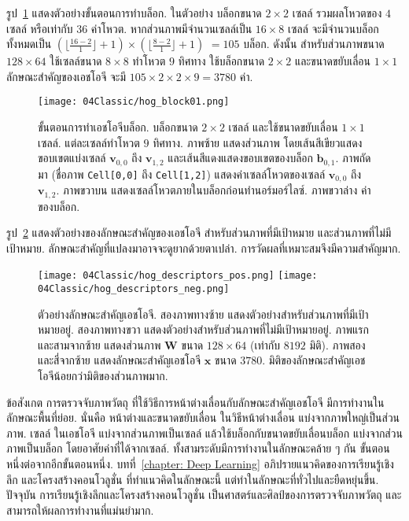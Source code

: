 รูป~\ref{fig: hog block01} 
แสดงตัวอย่างขั้นตอนการทำบล็อก.
ในตัวอย่าง บล็อกขนาด $2 \times 2$ เซลล์ รวมผลโหวตของ $4$ เซลล์ หรือเท่ากับ $36$ ค่าโหวต.
หากส่วนภาพมีจำนวนเซลล์เป็น $16 \times 8$ เซลล์
จะมีจำนวนบล็อกทั้งหมดเป็น $\left( \lfloor \frac{16 - 2}{1} \rfloor + 1 \right) \times \left( \lfloor \frac{8 - 2}{1} \rfloor + 1 \right)$ $=105$ บล็อก.
ดังนั้น สำหรับส่วนภาพขนาด $128 \times 64$ ใช้เซลล์ขนาด $8 \times 8$ ทำโหวต $9$ ทิศทาง
ใช้บล็อกขนาด $2 \times 2$ และขนาดขยับเลื่อน $1 \times 1$ 
ลักษณะสำคัญของเอชโอจี จะมี $105 \times 2 \times 2 \times 9 = 3780$ ค่า.

%
\begin{figure}
	\begin{center}
			\texttt{[image: 04Classic/hog\_block01.png]}
		\caption[ตัวอย่างการทำเอชโอจีบล็อก]{ขั้นตอนการทำเอชโอจีบล็อก.
		บล็อกขนาด $2 \times 2$ เซลล์ และใช้ขนาดขยับเลื่อน $1 \times 1$ เซลล์.
		แต่ละเซลล์ทำโหวต $9$ ทิศทาง.
		ภาพซ้าย แสดงส่วนภาพ โดยเส้นสีเขียวแสดงขอบเขตแบ่งเซลล์ $\bm{v}_{0,0}$ ถึง $\bm{v}_{1,2}$
		และเส้นสีแดงแสดงขอบเขตของบล็อก $\bm{b}_{0,1}$.	
		ภาพถัดมา (ชื่อภาพ \texttt{Cell[0,0]} ถึง \texttt{Cell[1,2]}) แสดงค่าเซลล์โหวตของเซลล์ $\bm{v}_{0,0}$ ถึง $\bm{v}_{1,2}$.
		ภาพขวาบน แสดงเซลล์โหวตภายในบล็อกก่อนทำนอร์มอร์ไลซ์.
		ภาพขวาล่าง ค่าของบล็อก.
		}
		\label{fig: hog block01}
	\end{center}
\end{figure}
%

รูป~\ref{fig: hog descriptors} แสดงตัวอย่างของลักษณะสำคัญของเอชโอจี สำหรับส่วนภาพที่มีเป้าหมาย และส่วนภาพที่ไม่มีเป้าหมาย.
ลักษณะสำคัญที่แปลงมาอาจจะดูยากด้วยตาเปล่า.
การวัดผลที่เหมาะสมจึงมีความสำคัญมาก. 

%
\begin{figure}
	\begin{center}
		\texttt{[image: 04Classic/hog\_descriptors\_pos.png]}
		\texttt{[image: 04Classic/hog\_descriptors\_neg.png]}
		\caption[ตัวอย่างลักษณะสำคัญเอชโอจี]{ตัวอย่างลักษณะสำคัญเอชโอจี.
		สองภาพทางซ้าย แสดงตัวอย่างสำหรับส่วนภาพที่มีเป้าหมายอยู่.
		สองภาพทางขวา แสดงตัวอย่างสำหรับส่วนภาพที่ไม่มีเป้าหมายอยู่.
		ภาพแรกและสามจากซ้าย แสดงส่วนภาพ $\bm{W}$ ขนาด $128 \times 64$ (เท่ากับ $8192$ มิติ).
		ภาพสองและสี่จากซ้าย แสดงลักษณะสำคัญเอชโอจี $\bm{x}$ ขนาด $3780$.
		มิติของลักษณะสำคัญเอชโอจีน้อยกว่ามิติของส่วนภาพมาก.
		}
		\label{fig: hog descriptors}
	\end{center}
\end{figure}
%

ข้อสังเกต
การตรวจจับภาพวัตถุ ที่ใช้วิธีการหน้าต่างเลื่อนกับลักษณะสำคัญเอชโอจี
มีการทำงานในลักษณะพื้นที่ย่อย.
นั่นคือ 
หน้าต่างและขนาดขยับเลื่อน ในวิธีหน้าต่างเลื่อน แบ่งจากภาพใหญ่เป็นส่วนภาพ.
เซลล์ ในเอชโอจี แบ่งจากส่วนภาพเป็นเซลล์
แล้วใช้บล็อกกับขนาดขยับเลื่อนบล็อก แบ่งจากส่วนภาพเป็นบล็อก โดยอาศัยค่าที่ได้จากเซลล์.
ทั้งสามระดับมีการทำงานในลักษณะคล้าย ๆ กัน ขั้นตอนหนึ่งต่อจากอีกขั้นตอนหนึ่ง.
บทที่~\ref{chapter: Deep Learning} อภิปรายแนวคิดของการเรียนรู้เชิงลึก และโครงสร้างคอนโวลูชั่น
ที่ทำแนวคิดในลักษณะนี้ แต่ทำในลักษณะที่ทั่วไปและยืดหยุ่นขึ้น.
ปัจจุบัน การเรียนรู้เชิงลึกและโครงสร้างคอนโวลูชั่น
เป็นศาสตร์และศิลป์ของการตรวจจับภาพวัตถุ
และสามารถให้ผลการทำงานที่แม่นยำมาก.

